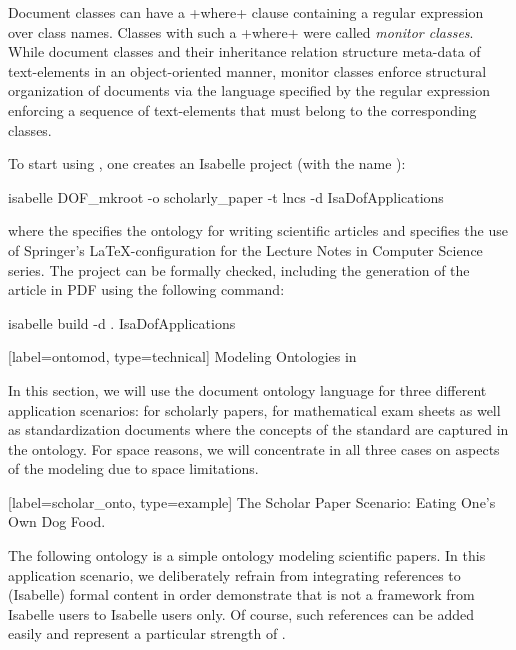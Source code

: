 \begin{isabellebody}
\begin{isamarkuptext}
Document classes can have a \inlineisar+where+ clause containing a regular 
expression over class names. Classes with such a \inlineisar+where+ were called \emph{monitor classes}.
While document classes and their inheritance relation structure meta-data of text-elements
in an object-oriented manner, monitor classes enforce structural organization
of documents via the language specified by the regular expression 
enforcing a sequence of text-elements that must belong to the corresponding classes. 

To start using \isadof, one creates an Isabelle project (with the name 
):
\begin{bash}
  isabelle DOF_mkroot -o scholarly_paper -t lncs -d  IsaDofApplications
\end{bash}
where the  specifies the ontology for writing scientific articles and 
 specifies the use of Springer's \LaTeX-configuration for the Lecture Notes in Computer Science series. The project 
can be formally checked, including the generation of the article in PDF using the 
following command:
\begin{bash}
  isabelle build -d . IsaDofApplications
\end{bash}%
\end{isamarkuptext}\isamarkuptrue%
%
\isaDofSectionTechnical%
%
[label={ontomod}, type={technical}]%
{Modeling Ontologies in \isadof}%
%
\begin{isamarkuptext}%
In this section, we will use the \isadof document ontology language
for three different application scenarios: for scholarly papers, for mathematical 
exam sheets as well as standardization documents where the concepts of the
standard are captured in the ontology. For space reasons, we will concentrate in all three
cases on aspects of the modeling due to space limitations.%
\end{isamarkuptext}\isamarkuptrue%
%
\isaDofSubsectionExample%
%
[label={scholar_onto}, type={example}]%
{The Scholar Paper Scenario: Eating One's Own Dog Food.}%
%
\begin{isamarkuptext}%
The following ontology is a simple ontology modeling scientific papers. In this 
\isadof application scenario, we deliberately refrain from integrating references to
(Isabelle) formal content in order  demonstrate that \isadof is not a framework from 
Isabelle users to Isabelle users only.
Of course, such references can be added easily and represent a particular strength  
of \isadof.


\end{isamarkuptext}
\end{isabellebody}

